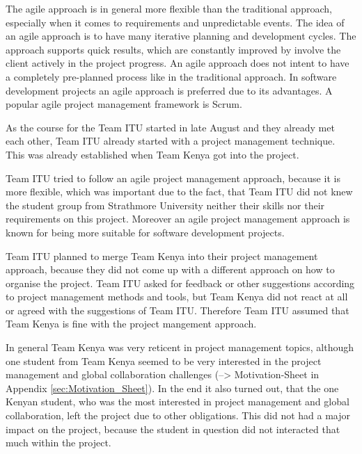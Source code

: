 
The agile approach is in general more flexible than the traditional approach, especially when it comes to requirements and unpredictable events. The idea of an agile approach is to have many iterative planning and development cycles. The approach supports quick results, which are constantly improved by involve the client actively in the project progress. An agile approach does not intent to have a completely pre-planned process like in the traditional approach. In software development projects an agile approach is preferred due to its advantages. A popular agile project management framework is Scrum\cite{scrum}.

As the course for the Team ITU started in late August and they already met each other, Team ITU already started with a project management technique. This was already established when Team Kenya got into the project.

Team ITU tried to follow an agile project management approach, because it is more flexible, which was important due to the fact, that Team ITU did not knew the student group from Strathmore University neither their skills nor their requirements on this project. Moreover an agile project management approach is known for being more suitable for software development projects\cite{project_management_approches}.

Team ITU planned to merge Team Kenya into their project management approach, because they did not come up with a different approach on how to organise the project. Team ITU asked for feedback or other suggestions according to project management methods and tools, but Team Kenya did not react at all or agreed with the suggestions of Team ITU. Therefore Team ITU assumed that Team Kenya is fine with the project mangement approach.

In general Team Kenya was very reticent in project management topics, although one student from Team Kenya seemed to be very interested in the project management and global collaboration challenges (--> Motivation-Sheet in Appendix \ref{sec:Motivation_Sheet}). In the end it also turned out, that the one Kenyan student, who was the most interested in project management and global collaboration, left the project due to other obligations. This did not had a major impact on the project, because the student in question did not interacted that much within the project.

